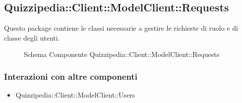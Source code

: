\subsection{Quizzipedia::Client::ModelClient::Requests}
Questo package contiene le classi necessarie a gestire le richieste di ruolo e di classe degli utenti.
\begin{figure}[H]
\centering
\noindent{}
\caption[Quizzipedia::Client::ModelClient::Requests]{Schema Componente Quizzipedia::Client::ModelClient::Requests}
\end{figure}
\subsubsection{Interazioni con altre componenti}
\begin{itemize}
\item Quizzipedia::Client::ModelClient::Users
\end{itemize}

